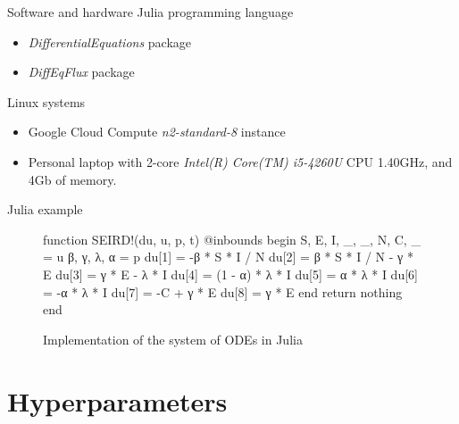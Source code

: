 \begin{frame}{Software and hardware}
    Julia programming language
    \begin{itemize}
        \item \textit{DifferentialEquations} package
        \item \textit{DiffEqFlux} package
    \end{itemize}

    Linux systems
    \begin{itemize}
        \item Google Cloud Compute \textit{n2-standard-8} instance
        \item Personal laptop with 2-core \textit{Intel(R) Core(TM) i5-4260U} CPU 1.40GHz, and 4Gb of memory.
    \end{itemize}
\end{frame}

\begin{frame}[fragile]{Julia example}
\begin{figure}[!htb]
\centering
\begin{jllisting}
function SEIRD!(du, u, p, t)
    @inbounds begin
        S, E, I, _, _, N, C, _ = u
        β, γ, λ, α = p
        du[1] = -β * S * I / N
        du[2] = β * S * I / N - γ * E
        du[3] = γ * E - λ * I
        du[4] = (1 - α) * λ * I
        du[5] = α * λ * I
        du[6] = -α * λ * I
        du[7] = -C + γ * E
        du[8] = γ * E
    end
    return nothing
end
\end{jllisting}
\caption{Implementation of the system of ODEs in Julia}
\label{fig:diffeq-seird-inplace}
\end{figure}
\end{frame}

\section{Hyperparameters}

